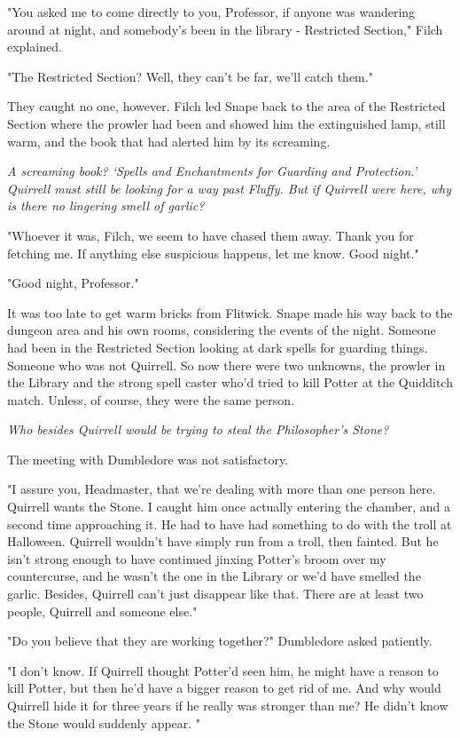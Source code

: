 \documentclass[a4paper,11pt]{article}
\begin{document}
"You asked me to come directly to you, Professor, if anyone was wandering around at night, and somebody's been in the library - Restricted Section," Filch explained.

"The Restricted Section? Well, they can't be far, we'll catch them."

They caught no one, however. Filch led Snape back to the area of the Restricted Section where the prowler had been and showed him the extinguished lamp, still warm, and the book that had alerted him by its screaming.

\emph{A screaming book? `Spells and Enchantments for Guarding and Protection.' Quirrell must still be looking for a way past Fluffy. But if Quirrell were here, why is there no lingering smell of garlic?}

"Whoever it was, Filch, we seem to have chased them away. Thank you for fetching me. If anything else suspicious happens, let me know. Good night."

"Good night, Professor."

It was too late to get warm bricks from Flitwick. Snape made his way back to the dungeon area and his own rooms, considering the events of the night. Someone had been in the Restricted Section looking at dark spells for guarding things. Someone who was not Quirrell. So now there were two unknowns, the prowler in the Library and the strong spell caster who'd tried to kill Potter at the Quidditch match. Unless, of course, they were the same person.

\emph{Who besides Quirrell would be trying to steal the Philosopher's Stone?}

The meeting with Dumbledore was not satisfactory.

"I assure you, Headmaster, that we're dealing with more than one person here. Quirrell wants the Stone. I caught him once actually entering the chamber, and a second time approaching it. He had to have had something to do with the troll at Halloween. Quirrell wouldn't have simply run from a troll, then fainted. But he isn't strong enough to have continued jinxing Potter's broom over my countercurse, and he wasn't the one in the Library or we'd have smelled the garlic. Besides, Quirrell can't just disappear like that. There are at least two people, Quirrell and someone else."

"Do you believe that they are working together?" Dumbledore asked patiently.

"I don't know. If Quirrell thought Potter'd seen him, he might have a reason to kill Potter, but then he'd have a bigger reason to get rid of me. And why would Quirrell hide it for three years if he really was stronger than me? He didn't know the Stone would suddenly appear. "
\end{document}
